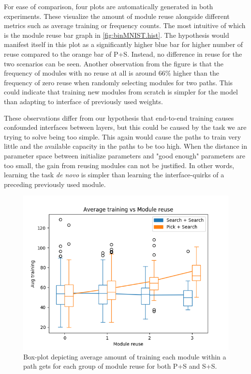 For ease of comparison, four plots are automatically generated in both experiments. These visualize the amount of module reuse alongside different metrics such as average training or frequency counts. 
The most intuitive of which is the module reuse bar graph in \ref{fig:binMNIST.hist}. The hypothesis would manifest itself in this plot as a significantly higher blue bar for higher number of reuse compared to the orange bar of P+S. Instead, no difference in reuse for the two scenarios can be seen. Another observation from the figure is that the frequency of modules with no reuse at all is around 66\% higher than the frequency of zero reuse when randomly selecting modules for two paths. This could indicate that training new modules from scratch is simpler for the model than adapting to interface of previously used weights.

These observations differ from our hypothesis that end-to-end training causes confounded interfaces between layers, but this could be caused by the task we are trying to solve being too simple. This again would cause the paths to train very little and the available capacity in the paths to be too high. When the distance in parameter space between initialize parameters and "good enough" parameters are too small, the gain from reusing modules can not be justified. In other words, learning the task \textit{de novo} is simpler than learning the interface-quirks of a preceding previously used module.

\begin{figure}[t]
    \includegraphics[width=\textwidth]{Chapters/4.Experiments/exp1/figures/600binMNIST_training_boxplot.png}
    \caption{Box-plot depicting average amount of training each module within a path gets for each group of module reuse for both P+S and S+S. }
    \label{fig:binMNIST.box}
\end{figure}

